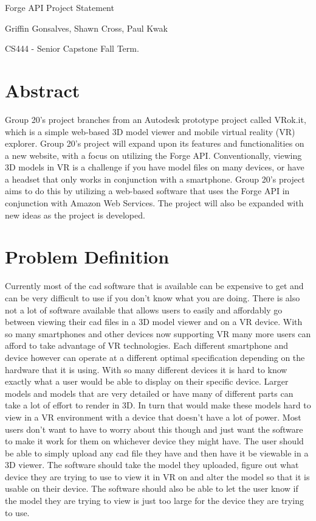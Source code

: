 \documentclass[letterpaper,10pt,draftclsnofoot,onecolumn, titlepage]{IEEEtran}
\begin{document}
\begin{titlepage}
\centering
{\huge Forge API Project Statement\par}
\vfill
{\LARGE Griffin Gonsalves, Shawn Cross, Paul Kwak\par}
{\vspace{2mm}}
{\large CS444 - Senior Capstone Fall Term. \par}
{\vspace{10mm}}
\end{titlepage}

\section{Abstract}
{Group 20’s project branches from an Autodesk prototype project called VRok.it, which is a simple web-based 3D model viewer and mobile virtual reality (VR) explorer. Group 20’s project will expand upon its features and functionalities on a new website, with a focus on utilizing the Forge API. Conventionally, viewing 3D models in VR is a challenge if you have model files on many devices, or have a headset that only works in conjunction with a smartphone. Group 20’s project aims to do this by utilizing a web-based software that uses the Forge API in conjunction with Amazon Web Services. The project will also be expanded with new ideas as the project is developed.\par}
\section{Problem Definition}
{Currently most of the cad software that is available can be expensive to get and can be very difficult to use if you don’t know what you are doing. There is also not a lot of software available that allows users to easily and affordably go between viewing their cad files in a 3D model viewer and on a VR device. With so many smartphones and other devices now supporting VR many more users can afford to take advantage of VR technologies. Each different smartphone and device however can operate at a different optimal specification depending on the hardware that it is using. With so many different devices it is hard to know exactly what a user would be able to display on their specific device. Larger models and models that are very detailed or have many of different parts can take a lot of effort to render in 3D. In turn that would make these models hard to view in a VR environment with a device that doesn’t have a lot of power. Most users don't want to have to worry about this though and just want the software to make it work for them on whichever device they might have. The user should be able to simply upload any cad file they have and then have it be viewable in a 3D viewer.  The software should take the model they uploaded, figure out what device they are trying to use to view it in VR on and alter the model so that it is usable on their device. The software should also be able to let the user know if the model they are trying to view is just too large for the device they are trying to use. 
\par}
\end{document}
